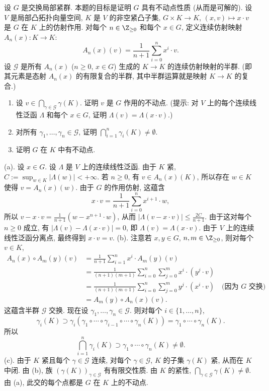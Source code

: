 \begin{exercise}[交换局部紧群的可解性]
\label{ex:III.6.3.5}
设 $G$ 是交换局部紧群. 本题的目标是证明 $G$ 具有不动点性质 (从而是可解的).
设 $V$ 是局部凸拓扑向量空间, $K$ 是 $V$ 的非空紧凸子集, $G \times K \to K$, $(x, v) \longmapsto x \cdot v$ 是 $G$ 在 $K$ 上的仿射作用.
对每个 $n \in \Z_{\geq 0}$ 和每个 $x \in G$, 定义连续仿射映射 $A_n(x) \colon K \to K$:
\[
A_n(x)(v) = \frac{1}{n+1}\sum_{i=0}^n x^i \cdot v.
\]
设 $\mathcal{G}$ 是所有 $A_n(x)$ ($n \geq 0$, $x \in G$) 生成的 $K \to K$ 的连续仿射映射的半群. (即其元素是态射 $A_n(x)$ 的有限复合的半群, 其中半群运算就是映射 $K \to K$ 的复合.)
\begin{enumerate}
\item[(a)] 设 $v \in \bigcap_{\gamma \in \mathcal{G}}\gamma(K)$. 证明 $v$ 是 $G$ 作用的不动点. (提示: 对 $V$ 上的每个连续线性泛函 $\Lambda$ 和每个 $x \in G$, 证明 $\Lambda(v) = \Lambda(x \cdot v)$.)
\item[(b)] 对所有 $\gamma_1, \ldots, \gamma_n \in \mathcal{G}$, 证明 $\bigcap_{i=1}^n\gamma_i(K) \neq \emptyset$.
\item[(c)] 证明 $G$ 在 $K$ 中有不动点.
\end{enumerate}
\end{exercise}

\begin{solution}
(a). 设 $x \in G$. 设 $\Lambda$ 是 $V$ 上的连续线性泛函. 由于 $K$ 紧, $C := \sup_{w \in K}|\Lambda(w)| < +\infty$. 若 $n \geq 0$, 有 $v \in A_n(x)(K)$, 所以存在 $w \in K$ 使得 $v = A_n(x)(w)$. 由于 $G$ 的作用仿射, 这蕴含
\[
x \cdot v = \frac{1}{n+1}\sum_{i=0}^n x^{i+1} \cdot w,
\]
所以 $v - x \cdot v = \frac{1}{n+1}(w - x^{n+1} \cdot w)$, 从而 $|\Lambda(v - x \cdot v)| \leq \frac{2C}{n+1}$. 由于这对每个 $n \geq 0$ 成立, 有 $|\Lambda(v) - \Lambda(x \cdot v)| = 0$, 即 $\Lambda(v) = \Lambda(x \cdot v)$. 由于 $V$ 上的连续线性泛函分离点, 最终得到 $x \cdot v = v$.
(b). 注意若 $x, y \in G$, $n, m \in \Z_{\geq 0}$, 则对每个 $v \in K$,
\begin{align*}
A_n(x) \circ A_m(y)(v) &= \frac{1}{n+1}\sum_{i=1}^n x^i \cdot A_m(y)(v) \\
&= \frac{1}{(n+1)(m+1)}\sum_{i=0}^n\sum_{j=0}^m x^i \cdot (y^j \cdot v) \\
&= \frac{1}{(n+1)(m+1)}\sum_{i=0}^n\sum_{j=0}^m y^j \cdot (x^i \cdot v) \quad \text{(因为 } G \text{ 交换)} \\
&= A_m(y) \circ A_n(x)(v).
\end{align*}
这蕴含半群 $\mathcal{G}$ 交换.
现在设 $\gamma_1, \ldots, \gamma_n \in \mathcal{G}$. 则对每个 $i \in \{1, \ldots, n\}$,
\[
\gamma_i(K) \supset \gamma_i(\gamma_1 \circ \cdots \circ \gamma_{i-1} \circ \cdots \circ \gamma_n(K)) = \gamma_1 \circ \cdots \circ \gamma_n(K).
\]
所以
\[
\bigcap_{i=1}^n\gamma_i(K) \supset \gamma_1 \circ \cdots \circ \gamma_n(K) \neq \emptyset.
\]
(c). 由于 $K$ 紧且每个 $\gamma \in \mathcal{G}$ 连续, 对每个 $\gamma \in \mathcal{G}$, $K$ 的子集 $\gamma(K)$ 紧, 从而在 $K$ 中闭. 由 (b), 族 $(\gamma(K))_{\gamma \in \mathcal{G}}$ 有有限交性质. 由 $K$ 的紧性, $\bigcap_{\gamma \in \mathcal{G}}\gamma(K) \neq \emptyset$. 由 (a), 此交的每个点都是 $G$ 在 $K$ 上的不动点.
\end{solution}

